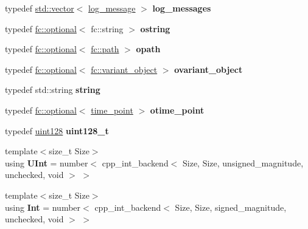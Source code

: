 \begin{DoxyCompactItemize}
typedef \mbox{\hyperlink{classstd_1_1vector}{std\+::vector}}$<$ \mbox{\hyperlink{classfc_1_1log__message}{log\+\_\+message}} $>$ {\bfseries log\+\_\+messages}
\item 
\mbox{\label{namespacefc_abc1bede2fe1f4c10a2dc9ab4b8ddc656}} 
typedef \mbox{\hyperlink{classfc_1_1optional}{fc\+::optional}}$<$ fc\+::string $>$ {\bfseries ostring}
\item 
\mbox{\label{namespacefc_a454f339e33678107b206f925ddb7237b}} 
typedef \mbox{\hyperlink{classfc_1_1optional}{fc\+::optional}}$<$ \mbox{\hyperlink{classfc_1_1path}{fc\+::path}} $>$ {\bfseries opath}
\item 
\mbox{\label{namespacefc_acbb95eb9af4c73366c47e15ad4c5a183}} 
typedef \mbox{\hyperlink{classfc_1_1optional}{fc\+::optional}}$<$ \mbox{\hyperlink{classfc_1_1variant__object}{fc\+::variant\+\_\+object}} $>$ {\bfseries ovariant\+\_\+object}
\item 
\mbox{\label{namespacefc_a0f3d84fe9e7adcd2d1e0bb7b60b49aa0}} 
typedef std\+::string {\bfseries string}
\item 
\mbox{\label{namespacefc_acb5e8b1c238084c288156f135678ba6a}} 
typedef \mbox{\hyperlink{classfc_1_1optional}{fc\+::optional}}$<$ \mbox{\hyperlink{classfc_1_1time__point}{time\+\_\+point}} $>$ {\bfseries otime\+\_\+point}
\item 
\mbox{\label{namespacefc_a38f54e99999434b6e6268902c10651c4}} 
typedef \mbox{\hyperlink{classfc_1_1uint128}{uint128}} {\bfseries uint128\+\_\+t}
\item 
\mbox{\label{namespacefc_af8e1ff97499e0236887c6b3214121593}} 
{\footnotesize template$<$size\+\_\+t Size$>$ }\\using {\bfseries U\+Int} = number$<$ cpp\+\_\+int\+\_\+backend$<$ Size, Size, unsigned\+\_\+magnitude, unchecked, void $>$ $>$
\item 
\mbox{\label{namespacefc_ad4266df284dc4963fadad915eaee49a2}} 
{\footnotesize template$<$size\+\_\+t Size$>$ }\\using {\bfseries Int} = number$<$ cpp\+\_\+int\+\_\+backend$<$ Size, Size, signed\+\_\+magnitude, unchecked, void $>$ $>$

\end{DoxyCompactItemize}
